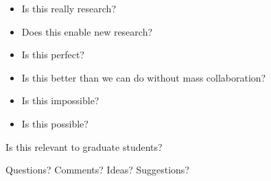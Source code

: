 \documentclass[aspectratio=169]{beamer}
\begin{document}
\begin{frame}

\begin{itemize}
\item Is this really research?
\pause
\item Does this enable new research?
\end{itemize}

\end{frame}
\begin{frame}

\begin{itemize}
\item Is this perfect?
\pause
\item Is this better than we can do without mass collaboration?
\end{itemize}

\end{frame}
\begin{frame}

\begin{itemize}
\item Is this impossible?
\pause
\item Is this possible?
\end{itemize}

\end{frame}
\begin{frame}

Is this relevant to graduate students?

\end{frame}
\begin{frame}

{\Large
\begin{center}
Questions?  Comments?  Ideas? Suggestions?
\end{center}
}

\end{frame}
\end{document}
